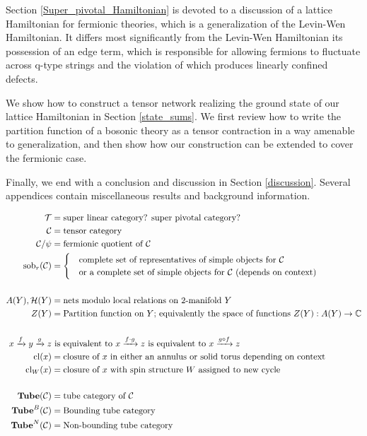 Section \ref{Super_pivotal_Hamiltonian} is devoted to a discussion of a lattice Hamiltonian for fermionic theories, which is a generalization of the Levin-Wen Hamiltonian. 
It differs most significantly from the Levin-Wen Hamiltonian its possession of an edge term, which 
is responsible for allowing fermions to fluctuate across q-type strings and the violation 
of which produces linearly confined defects. 

We show how to construct a tensor network realizing the ground state of our lattice Hamiltonian 
in Section \ref{state_sums}. We first review how to write the partition function of a bosonic theory 
as a tensor contraction in a way amenable to generalization, and then show how our construction 
can be extended to cover the fermionic case. 

Finally, we end with a conclusion and discussion in Section \ref{discussion}. 
Several appendices contain miscellaneous results and background information. 

\bigskip
{}
\begin{align}
\mathcal{T} &= \text{super linear category? super pivotal category?}\\
\mathcal{C} &= \text{tensor category}\\
\mathcal{C}/\psi & = \text{fermionic quotient of $\mathcal{C}$}\\
\text{sob}_r(\mathcal{C}) & = 
\begin{cases} 
&\text{complete set of representatives of simple objects for $\mathcal{C}$} \\
& \text{or a complete set of simple objects for $\mathcal{C}$ (depends on context)}\\ 
\end{cases}\\
\\
A(Y),\mathcal{H}(Y) &= \text{nets modulo local relations on 2-manifold $Y$}\\
Z(Y) & = \text{Partition function on $Y$; equivalently the space of functions $Z(Y):A(Y)\rightarrow \mathbb{C}$}\\
\\
x \xrightarrow{f} y \xrightarrow{g} z &\text{ is equivalent to } x \xrightarrow{f \cdot g} z  \text{ is equivalent to } x \xrightarrow{g \circ f} z 
\\
\text{cl}(x) &= \text{closure of $x$ in either an annulus or solid torus depending on context}\\
\text{cl}_W(x) &= \text{closure of $x$ with spin structure $W$ assigned to new cycle}\\
\nonumber\\
\textbf{Tube}(\mathcal{C}) &= \text{tube category of $\mathcal{C}$}\\ 
\textbf{Tube}^B(\mathcal{C}) & = \text{Bounding tube category}\\
\textbf{Tube}^N(\mathcal{C}) & = \text{Non-bounding tube category} \\
\end{align}

